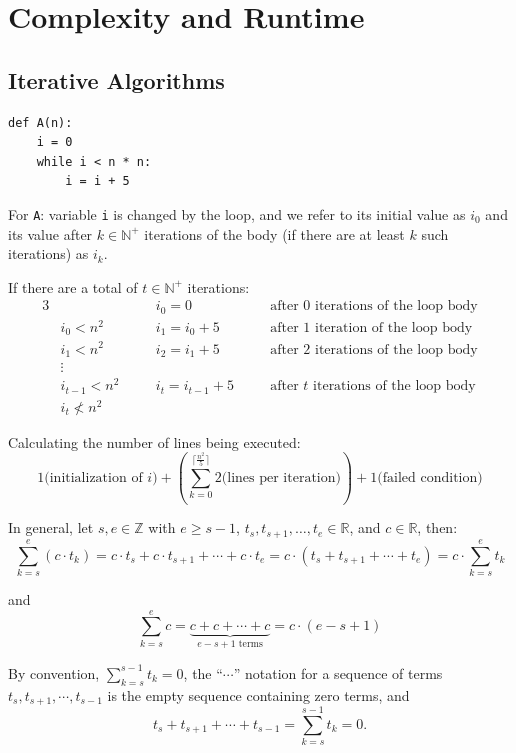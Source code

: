 \documentclass{article}
\begin{document}
\newpage
\section{Complexity and Runtime}
\subsection{Iterative Algorithms}
\begin{verbatim}
def A(n):
    i = 0
    while i < n * n:
        i = i + 5
\end{verbatim}
For \texttt{A}: variable \texttt{i} is changed by the loop, and we refer to its initial value as $i_0$ and its value after $k \in \mathbb{N}^+$ iterations of the body (if there are at least $k$ such iterations) as $i_k$.

If there are a total of $t\in\mathbb{N}^+$ iterations:
\begin{alignat*}{3}
&&& i_0 = 0 
&\quad& \text{after 0 iterations of the loop body} \\
& i_0 < n^2 
&\quad& i_1 = i_0 + 5 
&\quad& \text{after 1 iteration of the loop body} \\
& i_1 < n^2 
&\quad& i_2 = i_1 + 5 
&\quad& \text{after 2 iterations of the loop body} \\
& \vdots  \\
& i_{t-1} < n^2 
&\quad& i_t = i_{t-1} + 5 
&\quad& \text{after $t$ iterations of the loop body} \\
& i_t \nless n^2
\end{alignat*}

Calculating the number of lines being executed:
\[
1\text{(initialization of $i$)}+ \left(\sum_{k=0}^{\lceil{\frac{n^2}{5}\rceil}} 2\text{(lines per iteration)}\right) + 1\text{(failed condition)}
\]

In general, let $s,e \in \mathbb{Z}$ with $e \ge s - 1$, 
$t_s, t_{s+1}, \ldots, t_e \in \mathbb{R}$, and $c \in \mathbb{R}$, then:
\[
\sum_{k=s}^{e} (c \cdot t_k)
= c \cdot t_s + c \cdot t_{s+1} + \cdots + c \cdot t_e
= c \cdot (t_s + t_{s+1} + \cdots + t_e)
= c \cdot \sum_{k=s}^{e} t_k
\]

and
\[
\sum_{k=s}^{e} c
= \underbrace{c + c + \cdots + c}_{e - s + 1 \text{ terms}}
= c \cdot (e - s + 1)
\]

By convention, $\sum_{k=s}^{s-1} t_k = 0$, the ``$\cdots$'' notation for a sequence of terms 
$t_s, t_{s+1}, \cdots, t_{s-1}$ is the empty sequence containing zero terms, and
\[
t_s + t_{s+1} + \cdots + t_{s-1}
= \sum_{k=s}^{s-1} t_k = 0.
\]
\end{document}

